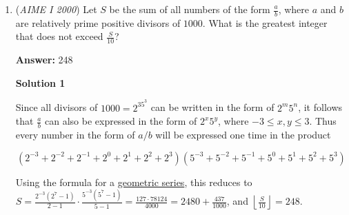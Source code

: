 \begin{enumerate}
Due to the problem's unique setup, we can actually represent every $x_k$ in terms of its sum, call it $S$. For any $x_k$,
 \[x_k = \frac{S}{2} - \frac{k}{2}\]We can show that this works because the sum of the other $99$ terms is now equal to $\frac{S}{2} + \frac{k}{2}$, and the difference is indeed $k$. The motivation to find that we need an $\frac{S}{2}$ term lies in that the difference between $x_k$ and the $99$ other terms is an integer, and not an expression in terms of $S$, and allowing $x_k$ to be in terms of $\frac{S}{2}$ is the only way to achieve this.

 Now, finding the numerical value of $S$ solves the problem. Summing all terms from $x_1$ to $x_{100}$, we find
 \[S = \sum_{k=1}^{100} x_k = 100\frac{S}{2} - \sum_{k=1}^{100} \frac{k}{2} = 50S - \frac{100\cdot\frac{1 + 100}{2}}{2} = 50S - 2525\]

 We obtain $S = \frac{2525}{49}$, and we now only need to find $x_{50}$, which is represented as $\frac{S}{2} - \frac{50}{2}$. Substituting, 
 \[x_{50} = \frac{2525}{49\cdot2} - 25 = \frac{25\cdot101 - 25\cdot98}{98} = \frac{75}{98}\]Our desired answer is thus $75 + 98 = \boxed{173}$



	\item (\textit{AIME I 2000}) Let $S$ be the sum of all numbers of the form $\frac{a}{b}$, where $a$ and $b$ are relatively prime positive divisors of $1000.$ What is the greatest integer that does not exceed $\frac{S}{10}$?


 
 \textbf{Answer: }248



\textbf{Solution 1}

Since all divisors of $1000 = 2^35^3$ can be written in the form of $2^{m}5^{n}$, it follows that $\frac{a}{b}$ can also be expressed in the form of $2^{x}5^{y}$, where $-3 \le x,y \le 3$. Thus every number in the form of $a/b$ will be expressed one time in the product

 
 \[(2^{-3} + 2^{-2} + 2^{-1} + 2^{0} + 2^{1} + 2^2 + 2^3)(5^{-3} + 5^{-2} +5^{-1} + 5^{0} + 5^{1} + 5^2 + 5^3)\]

 Using the formula for a \href{https://artofproblemsolving.com/wiki/index.php?title=Geometric\_series}{geometric series}, this reduces to $S = \frac{2^{-3}(2^7 - 1)}{2-1} \cdot \frac{5^{-3}(5^{7} - 1)}{5-1} = \frac{127 \cdot 78124}{4000} = 2480 + \frac{437}{1000}$, and $\left\lfloor \frac{S}{10} \right\rfloor = \boxed{248}$.


\end{enumerate}
